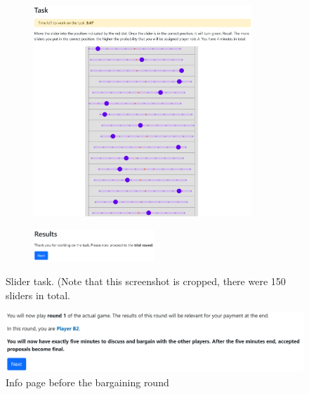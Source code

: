 \documentclass[12pt]{article}
\begin{document}
\begin{figure}[!htb]
   \begin{subfigure}[b]{\textwidth}
        \centering
        \includegraphics[width=0.9\textwidth]{screenshots/slider.pdf}
    \end{subfigure}
    \par\bigskip
    \begin{subfigure}[b]{\textwidth}
        \centering
        \includegraphics[width=0.5\textwidth]{screenshots/slider_results.pdf}
    \end{subfigure}
    \caption{Slider task. (Note that this screenshot is cropped, there were 150 sliders in total.}
\end{figure}

\begin{figure}[!htb]
    \centering
    \includegraphics[width=.9\linewidth]{screenshots/info.pdf}
    \caption{Info page before the bargaining round}
\end{figure}
\end{document}
